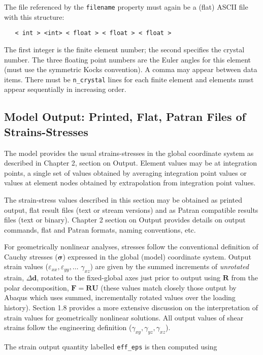 \documentclass[11pt]{report}
\numberwithin{equation}{section}
\newcommand{\ttt} {\texttt}  %
\newcommand{\bmf } {\boldsymbol }  %
\newcommand{\ti}{\emph}
\newcommand{\veps}{\varepsilon}
\newcommand{\noi}{\noindent}
\begin{document}
The file referenced by the \ttt{filename} property must again be a (flat) 
ASCII file with this structure:
\small\begin{verbatim}
   < int > <int> < float > < float > < float >
\end{verbatim}\normalsize

\noi The first integer is the finite element number;  the second specifies the
crystal number. The three floating point numbers are the Euler
angles for this element (must use the symmetric Kocks convention). A comma may
appear between data items. There must be
\ttt{n\_crystal} lines for each finite element and elements must appear
sequentially in increasing order.
\subsection{Model Output: Printed, Flat, Patran Files of Strains-Stresses}
The model provides the usual strains-stresses in the global coordinate system
as described in Chapter 2, section on Output.
Element values may be at integration points, a single set of values obtained by 
averaging integration point values or values at element nodes obtained by
extrapolation from integration point values. 

The strain-stress values described in this section may be obtained as 
printed output, flat result files (text or stream versions) and as
Patran compatible results files (text or binary).  Chapter 2 section on Output provides 
details on output commands, flat and Patran formats, naming
conventions, etc.

For geometrically
nonlinear analyses, stresses follow the conventional definition of
Cauchy stresses ($\bmf{\sigma}$) expressed in the global (model) coordinate system.
Output strain values ($\veps_{xx}, \veps_{yy}, \dots $ $\gamma_{xz}$)
are given by the summed increments of 
\ti{unrotated} strain, $\Delta \mathbf{d}$,
rotated to the fixed-global axes just prior to output
using $\mathbf{R}$ from the polar decomposition,
$\mathbf{F}=\mathbf{RU}$ (these values match closely those output by Abaqus 
which uses summed, incrementally rotated values over the loading history). 
Section 1.8 provides a more extensive discussion on the interpretation of strain 
values for geometrically nonlinear solutions. All output values of shear strains
follow the engineering definition ($\gamma_{xy}, \gamma_{yz}, \gamma_{xz}$).

The strain output quantity labelled \ttt{eff\_eps} is then computed using
\end{document}
